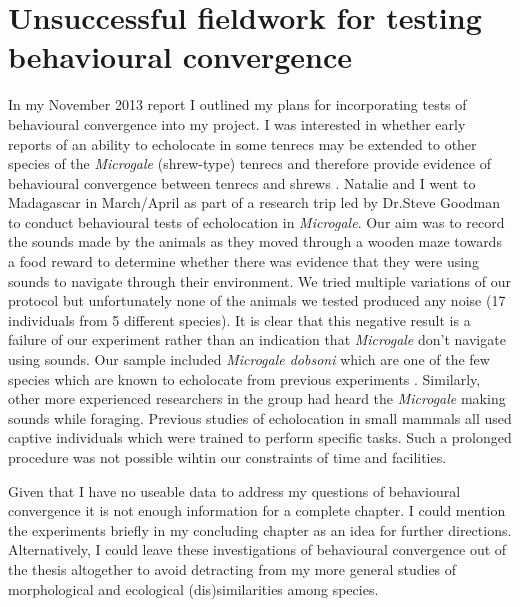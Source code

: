 \documentclass[12pt,a4paper]{article}
\begin{document}
\section{Unsuccessful fieldwork for testing behavioural convergence}
In my November 2013 report I outlined my plans for incorporating tests of behavioural convergence into my project. I was interested in whether early reports of an ability to echolocate in some tenrecs \citep{Gould1965} may be extended to other species of the \textit{Microgale} (shrew-type) tenrecs and therefore provide evidence of behavioural convergence between tenrecs and shrews \citep{Siemers2009}. Natalie and I went to Madagascar in March/April as part of a research trip led by Dr.Steve Goodman to conduct behavioural tests of echolocation in \textit{Microgale}. Our aim was to record the sounds made by the animals as they moved through a wooden maze towards a food reward to determine whether there was evidence that they were using sounds to navigate through their environment. We tried multiple variations of our protocol but unfortunately none of the animals we tested produced any noise (17 individuals from 5 different species). It is clear that this negative result is a failure of our experiment rather than an indication that \textit{Microgale} don't navigate using sounds. Our sample included \textit{Microgale dobsoni} which are one of the few species which are known to echolocate from previous experiments \citep{Gould1965}. Similarly, other more experienced researchers in the group had heard the \textit{Microgale} making sounds while foraging. Previous studies of echolocation in small mammals \citep{Gould1964, Gould1965, Tomasi1979, Siemers2009} all used captive individuals which were trained to perform specific tasks. Such a prolonged procedure was not possible wihtin our constraints of time and facilities.

Given that I have no useable data to address my questions of behavioural convergence it is not enough information for a complete chapter. I could mention the experiments briefly in my concluding chapter as an idea for further directions. Alternatively, I could leave these investigations of behavioural convergence out of the thesis altogether to avoid detracting from my more general studies of morphological and ecological (dis)similarities among species.
\end{document}
